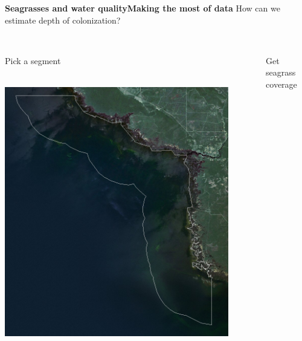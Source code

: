 \documentclass[serif]{beamer}\usepackage[]{graphicx}\usepackage[]{color}
\newenvironment{knitrout}{}{} %
\begin{document}
\begin{frame}{\textbf{Seagrasses and water quality}}{\textbf{Making the most of data}}
\onslide<+->
How can we estimate depth of colonization? \\~\\
\begin{columns}[T]
\onslide<+->
\begin{column}{0.32\textwidth}
Pick a segment\\~\\
\centerline{\includegraphics[width = 0.9\textwidth]{fig/map820.png}}
\end{column}
\onslide<+->
\begin{column}{0.32\textwidth}
Get seagrass coverage
\begin{knitrout}
\color{fgcolor}


\end{knitrout}
\end{column}
\end{columns}
\end{frame}
\end{document}
